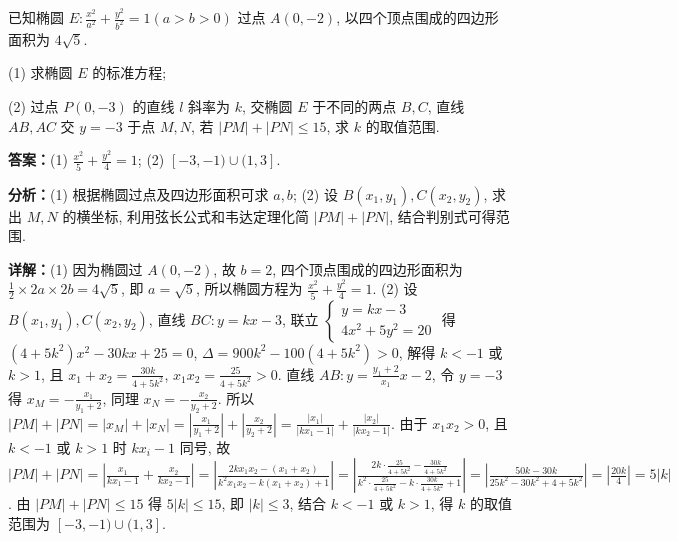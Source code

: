 \begin{question}[points=14]
已知椭圆 $E:\frac{x^2}{a^2}+\frac{y^2}{b^2}=1(a>b>0)$ 过点 $A(0,-2)$, 以四个顶点围成的四边形面积为 $4\sqrt{5}$.

(1) 求椭圆 $E$ 的标准方程;

(2) 过点 $P(0,-3)$ 的直线 $l$ 斜率为 $k$, 交椭圆 $E$ 于不同的两点 $B,C$, 直线 $AB,AC$ 交 $y=-3$ 于点 $M,N$, 若 $|PM|+|PN|\leq15$, 求 $k$ 的取值范围.
\begin{solution}
\textbf{答案：}(1) $\frac{x^2}{5}+\frac{y^2}{4}=1$; (2) $[-3,-1)\cup(1,3]$.

\textbf{分析：}(1) 根据椭圆过点及四边形面积可求 $a,b$; (2) 设 $B(x_1,y_1),C(x_2,y_2)$, 求出 $M,N$ 的横坐标, 利用弦长公式和韦达定理化简 $|PM|+|PN|$, 结合判别式可得范围.

\textbf{详解：}(1) 因为椭圆过 $A(0,-2)$, 故 $b=2$, 四个顶点围成的四边形面积为 $\frac{1}{2}\times2a\times2b=4\sqrt{5}$, 即 $a=\sqrt{5}$, 所以椭圆方程为 $\frac{x^2}{5}+\frac{y^2}{4}=1$.
(2) 设 $B(x_1,y_1),C(x_2,y_2)$, 直线 $BC:y=kx-3$, 联立 $\begin{cases} y=kx-3 \\ 4x^2+5y^2=20 \end{cases}$ 得 $(4+5k^2)x^2-30kx+25=0$, $\Delta=900k^2-100(4+5k^2)>0$, 解得 $k<-1$ 或 $k>1$, 且 $x_1+x_2=\frac{30k}{4+5k^2}$, $x_1x_2=\frac{25}{4+5k^2}>0$. 直线 $AB:y=\frac{y_1+2}{x_1}x-2$, 令 $y=-3$ 得 $x_M=-\frac{x_1}{y_1+2}$, 同理 $x_N=-\frac{x_2}{y_2+2}$. 所以 $|PM|+|PN|=|x_M|+|x_N|=\left|\frac{x_1}{y_1+2}\right|+\left|\frac{x_2}{y_2+2}\right|=\frac{|x_1|}{|kx_1-1|}+\frac{|x_2|}{|kx_2-1|}$. 由于 $x_1x_2>0$, 且 $k<-1$ 或 $k>1$ 时 $kx_i-1$ 同号, 故 $|PM|+|PN|=\left|\frac{x_1}{kx_1-1}+\frac{x_2}{kx_2-1}\right|=\left|\frac{2kx_1x_2-(x_1+x_2)}{k^2x_1x_2-k(x_1+x_2)+1}\right|=\left|\frac{2k\cdot\frac{25}{4+5k^2}-\frac{30k}{4+5k^2}}{k^2\cdot\frac{25}{4+5k^2}-k\cdot\frac{30k}{4+5k^2}+1}\right|=\left|\frac{50k-30k}{25k^2-30k^2+4+5k^2}\right|=\left|\frac{20k}{4}\right|=5|k|$. 由 $|PM|+|PN|\leq15$ 得 $5|k|\leq15$, 即 $|k|\leq3$, 结合 $k<-1$ 或 $k>1$, 得 $k$ 的取值范围为 $[-3,-1)\cup(1,3]$.
\end{solution}
\end{question}

